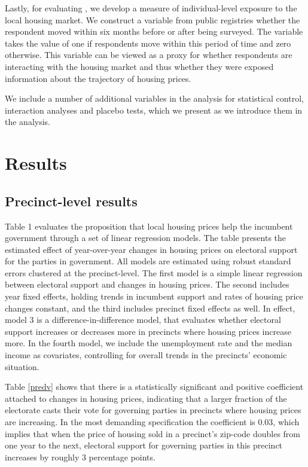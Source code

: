 \documentclass[12pt,a4paper]{article}
\begin{document}
	Lastly, for evaluating \htwo, we develop a measure of individual-level exposure to the local housing market. We construct a variable from public registries whether the respondent moved within six months before or after being surveyed. The variable takes the value of one if respondents move within this period of time and zero otherwise. This variable can be viewed as a proxy for whether respondents are interacting with the housing market and thus whether they were exposed information about the trajectory of housing prices.
	
	We include a number of additional variables in the analysis for statistical control, interaction analyses and placebo tests, which we present as we introduce them in the analysis. 
	
	
	\section{Results}
	
	\subsection{Precinct-level results}
	Table 1 evaluates the proposition that local housing prices help the incumbent government through a set of linear regression models. The table presents the estimated effect of year-over-year changes in housing prices on electoral support for the parties in government. All models are estimated using robust standard errors clustered at the precinct-level. The first model is a simple linear regression between electoral support and changes in housing prices. The second includes year fixed effects, holding trends in incumbent support and rates of housing price changes constant, and the third includes precinct fixed effects as well. In effect, model 3 is a difference-in-difference model, that evaluates whether electoral support increases or decreases more in precincts where housing prices increase more.  In the fourth model, we include the unemployment rate and the median income as covariates, controlling for overall  trends in the precincts’ economic situation. 
	
	
	
	Table \ref{predv} shows that there is a statistically significant and positive coefficient attached to changes in housing prices, indicating that a larger fraction of the electorate casts their vote for governing parties in precincts where housing prices are increasing. In the most demanding specification the coefficient is 0.03, which implies that when the price of housing sold in a precinct's zip-code doubles from one year to the next, electoral support for governing parties in this precinct increases by roughly 3 percentage points.
	
\end{document}
